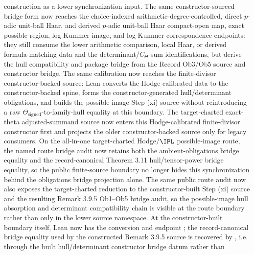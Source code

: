 \begin{proposition}
  construction as a lower synchronization input.  The same constructor-sourced
  bridge form now reaches the choice-indexed arithmetic-degree-controlled,
  direct \(p\)-adic unit-ball Haar, and derived \(p\)-adic unit-ball Haar
  compact-open map, exact possible-region, log-Kummer image, and log-Kummer
  correspondence endpoints: they still consume the lower arithmetic comparison,
  local Haar, or derived formula-matching data and the
  determinant/\(C_\Theta\)-sum identifications, but derive the hull
  compatibility and package bridge from the Record Ob3/Ob5 source and
  constructor bridge.  The same calibration now
  reaches the finite-divisor
  constructor-backed source:
  Lean converts the Hodge-calibrated data to the constructor-backed spine,
  forms the constructor-generated hull/determinant obligations, and builds the
  possible-image Step (xi) source without reintroducing a raw
  \(\Theta_{\mathrm{signed}}\)-to-family-hull equality at this boundary.  The
  target-charted exact-theta adjusted-summand source now enters this
  Hodge-calibrated finite-divisor constructor first and projects the older
  constructor-backed source only for legacy consumers.  On
  the all-in-one target-charted Hodge/\(\IPL\) possible-image route, the named
  route bridge audit now retains both the ambient-obligations bridge equality
  and the record-canonical Theorem 3.11 hull/tensor-power bridge equality, so
  the public finite-source boundary no longer hides this synchronization behind
  the obligations bridge projection alone.  The same public route audit now
  also exposes the target-charted reduction to the constructor-built Step (xi)
  source and the resulting Remark 3.9.5 Ob1--Ob5 bridge audit, so the
  possible-image hull absorption and determinant compatibility chain is
  visible at the route boundary rather than only in the lower source namespace.
  At the constructor-built boundary itself, Lean now has the conversion
  and endpoint
  ;
  the record-canonical bridge equality used by the constructed Remark 3.9.5
  source is recovered by
  ,
  i.e. through the built hull/determinant constructor bridge datum rather than

\end{proposition}
